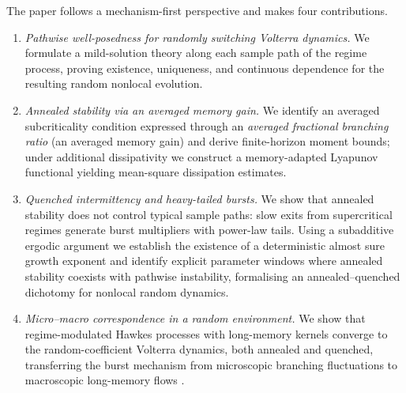 \documentclass[12pt,a4paper]{article}
\theoremstyle{plain}
\theoremstyle{definition}
\theoremstyle{remark}
\begin{document}
	The paper follows a mechanism-first perspective and makes four contributions.
	\begin{enumerate}[label=(\roman*),leftmargin=0.8cm]
		\item \textit{Pathwise well-posedness for randomly switching Volterra dynamics.}
		We formulate a mild-solution theory along each sample path of the regime process, proving existence, uniqueness, and continuous
		dependence for the resulting random nonlocal evolution.
		\item \textit{Annealed stability via an averaged memory gain.}
		We identify an averaged subcriticality condition expressed through an \emph{averaged fractional branching ratio} (an averaged memory
		gain) and derive finite-horizon moment bounds; under additional dissipativity we construct a memory-adapted Lyapunov functional
		yielding mean-square dissipation estimates.
		\item \textit{Quenched intermittency and heavy-tailed bursts.}
		We show that annealed stability does not control typical sample paths: slow exits from supercritical regimes generate burst
		multipliers with power-law tails.
		Using a subadditive ergodic argument we establish the existence of a deterministic almost sure growth exponent and identify explicit
		parameter windows where annealed stability coexists with pathwise instability, formalising an annealed--quenched dichotomy for
		nonlocal random dynamics.
		\item \textit{Micro--macro correspondence in a random environment.}
		We show that regime-modulated Hawkes processes with long-memory kernels converge to the random-coefficient Volterra dynamics, both
		annealed and quenched, transferring the burst mechanism from microscopic branching fluctuations to macroscopic long-memory flows
		\cite{hawkes1971spectra,bremaud1996,jaisson2015limit,jaisson2016rough,chevallier2019}.
	\end{enumerate}
	
\end{document}

